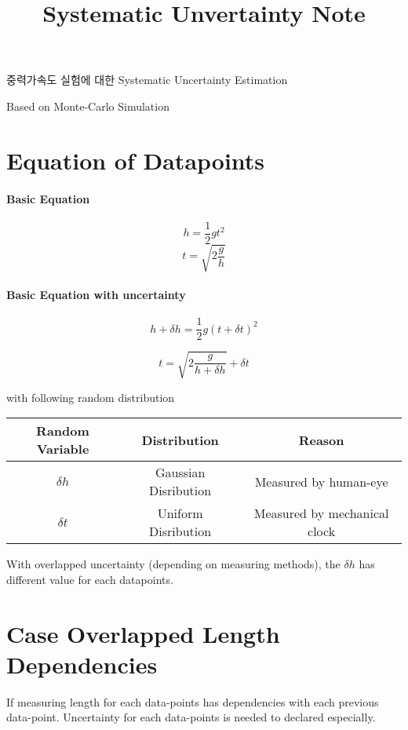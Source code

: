 \documentclass[]{article}
\title{Systematic Unvertainty Note}
\author{}
\begin{document}
\maketitle

중력가속도 실험에 대한 Systematic Uncertainty Estimation

Based on Monte-Carlo Simulation

\section{Equation of Datapoints}

\paragraph{Basic Equation}
\begin{equation}
h = \frac{1}{2} g t^2
\end{equation}
\begin{equation}
t = \sqrt{2 \frac{g}{h}}
\end{equation}

\paragraph{Basic Equation with uncertainty}

\begin{equation}
h+\delta h = \frac{1}{2} g \left(t+\delta t\right)^2
\end{equation}

\begin{equation}
t = \sqrt{2 \frac{g}{h+\delta h}} + \delta t
\end{equation}

with following random distribution

\begin{table}[!h]
	\begin{tabular}{c|cc}
		Random Variable & Distribution & Reason\\\hline
		$\delta h$ & Gaussian Disribution & Measured by human-eye\\
		$\delta t$ & Uniform Disribution & Measured by mechanical clock
	\end{tabular}	
\end{table}

With overlapped uncertainty (depending on measuring methods), the $\delta h$ has different value for each datapoints.


\section{Case Overlapped Length Dependencies}
If measuring length for each data-points has dependencies with each previous data-point. Uncertainty for each data-points is needed to declared especially.
\end{document}
